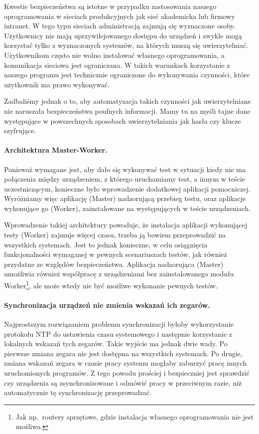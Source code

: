 \documentclass[00-praca-magisterska.tex]{subfiles}
\begin{document}
Kwestie bezpieczeństwa są istotne w przypadku zastosowania naszego
oprogramowania w sieciach produkcyjnych jak sieć akademicka lub firmowy
intranet. W tego typu sieciach administracją zajmują się wyznaczone osoby.
Użytkownicy nie mają uprzywilejowanego dostępu do urządzeń i zwykle mogą
korzystać tylko z wyznaczonych systemów, na których muszą się uwierzytelniać.
Użytkownikom często nie wolno instalować własnego oprogramowania, a komunikacja
sieciowa jest ograniczana. W takich warunkach korzystanie z naszego programu
jest technicznie ograniczone do wykonywania czynności, które użytkownik ma prawo
wykonywać. 


Zadbaliśmy jednak o to, aby automatyzacja takich czynności jak uwierzytelniane
nie naruszała bezpieczeństwa poufnych informacji. Mamy tu na myśli tajne dane
występujące w powszechnych sposobach uwierzytelniania jak hasła czy klucze
szyfrujące.

\paragraph{Architektura Master-Worker.} Ponieważ wymagane jest, aby dało się
wykonywać test w sytuacji kiedy nie ma połączenia między urządzeniem, z którego
uruchamiamy test, a innym w teście uczestniczącym, konieczne było wprowadzenie
dodatkowej aplikacji pomocniczej. Wyróżniamy więc aplikację (Master) nadzorującą
przebieg testu, oraz aplikacje wykonujące go (Worker), zainstalowane na
występujących w teście urządzeniach.


Wprowadzenie takiej architektury powoduje, że instalacja aplikacji wykonującej
testy (Worker) zajmuje więcej czasu, trzeba ją bowiem przeprowadzić na
wszystkich systemach.  Jest to jednak konieczne, w celu osiągnięcia
funkcjonalności wymaganej w pewnych scenariuszach testów, jak również przydatne
ze względów bezpieczeństwa. Aplikacja nadzorująca (Master) umożliwia również
współpracę z urządzeniami bez zainstalowanego modułu Worker\footnote{Jak
np.~routery sprzętowe, gdzie instalacja własnego oprogramowania nie jest
możliwa.}, ale może wtedy nie być możliwe wykonanie pewnych testów.

\paragraph{Synchronizacja urządzeń nie zmienia wskazań ich zegarów.}
Najprostszym rozwiązaniem problemu synchronizacji byłoby wykorzystanie protokołu
NTP do ustawienia czasu systemowego i następnie korzystanie z lokalnych wskazań
tych zegarów. Takie wyjście ma jednak dwie wady. Po pierwsze zmiana zegara nie
jest dostępna na wszystkich systemach. Po drugie, zmiana wskazań zegara w czasie
pracy systemu mogłaby zaburzyć pracę innych uruchomionych programów. Z tego
powodu prościej i bezpieczniej jest sprawdzić czy urządzenia są zsynchronizowane
i odmówić pracy w przeciwnym razie, niż automatycznie tę synchronizację
przeprowadzać.
\end{document}
